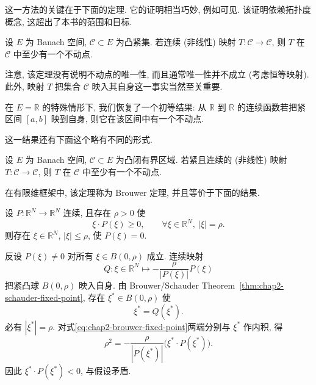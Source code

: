 这一方法的关键在于下面的定理. 它的证明相当巧妙, 例如可见. 该证明依赖拓扑度概念, 这超出了本书的范围和目标.

\begin{Theorem}
\label{thm:chap2-schauder-fixed-point}
设 $E$ 为 Banach 空间, $\mathcal{C}\subset E$ 为凸紧集. 若连续 (非线性) 映射 $T:\mathcal{C}\to\mathcal{C}$, 则 $T$ 在 $\mathcal{C}$ 中至少有一个不动点.
\end{Theorem}

注意, 该定理没有说明不动点的唯一性, 而且通常唯一性并不成立 (考虑恒等映射). 此外, 映射 $T$ 把集合 $\mathcal{C}$ 映入其自身这一事实当然至关重要.

在 $E=\mathbb{R}$ 的特殊情形下, 我们恢复了一个初等结果: 从 $\mathbb{R}$ 到 $\mathbb{R}$ 的连续函数若把紧区间 $[a,b]$ 映到自身, 则它在该区间中有一个不动点.

这一结果还有下面这个略有不同的形式.

\begin{Theorem}
\label{thm:chap2-schauder-compact-map-form}
设 $E$ 为 Banach 空间, $\mathcal{C}\subset E$ 为凸闭有界区域. 若紧且连续的 (非线性) 映射 $T:\mathcal{C}\to\mathcal{C}$, 则 $T$ 在 $\mathcal{C}$ 中至少有一个不动点.
\end{Theorem}

在有限维框架中, 该定理称为 Brouwer 定理, 并且等价于下面的结果.

\begin{Proposition}
\label{prop:chap2-brouwer-zero}
设 $P:\mathbb{R}^N\to\mathbb{R}^N$ 连续, 且存在 $\rho>0$ 使
\[
 \xi\cdot P(\xi)\geq0,
 \qquad\forall\xi\in\mathbb{R}^N,\ |\xi|=\rho.
\]
则存在 $\xi\in\mathbb{R}^N$, $|\xi|\leq\rho$, 使 $P(\xi)=0$.
\end{Proposition}

\begin{Proof}
反设 $P(\xi)\neq0$ 对所有 $\xi\in B(0,\rho)$ 成立. 连续映射
\[
 Q:\xi\in\mathbb{R}^N\longmapsto-\frac{\rho}{|P(\xi)|}P(\xi)
\]
把紧凸球 $B(0,\rho)$ 映入自身. 由 Brouwer/Schauder Theorem~\ref{thm:chap2-schauder-fixed-point}, 存在 $\xi^\ast\in B(0,\rho)$ 使
\begin{equation}
 \xi^\ast=Q(\xi^\ast).
 \label{eq:chap2-brouwer-fixed-point}
\end{equation}
必有 $|\xi^\ast|=\rho$. 对式\eqref{eq:chap2-brouwer-fixed-point}两端分别与 $\xi^\ast$ 作内积, 得
\[
 \rho^2=-\frac{\rho}{|P(\xi^\ast)|}\bigl(\xi^\ast\cdot P(\xi^\ast)\bigr).
\]
因此 $\xi^\ast\cdot P(\xi^\ast)<0$, 与假设矛盾.
\end{Proof}
